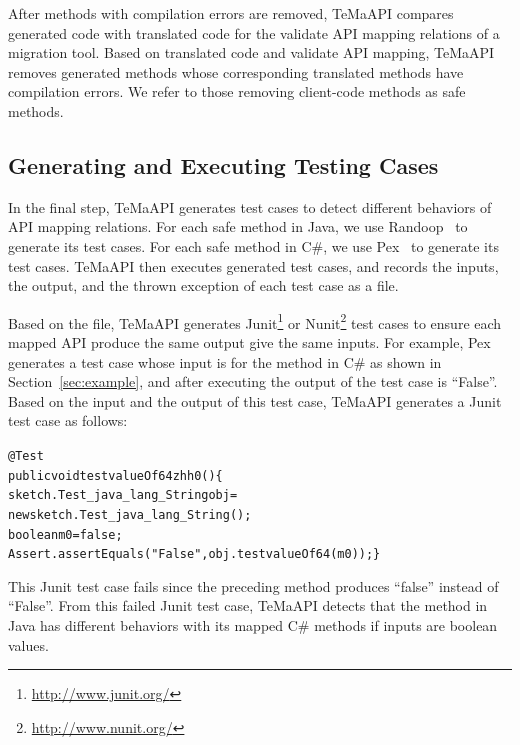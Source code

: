 After methods with compilation errors are removed, TeMaAPI compares generated code with translated code for the validate API mapping relations of a migration tool. Based on translated code and validate API mapping, TeMaAPI removes generated methods whose corresponding translated methods have compilation errors. We refer to those removing client-code methods as safe methods.

\subsection{Generating and Executing Testing Cases}
\label{sec:approach:mappingmethods}
In the final step, TeMaAPI generates test cases to detect different behaviors of API mapping relations. For each safe method in Java, we use Randoop~\cite{pacheco2007feedback} to generate its test cases. For each safe method in C\#, we use Pex~\cite{tillmann2008pex} to generate its test cases. TeMaAPI then executes generated test cases, and records the inputs, the output, and the thrown exception of each test case as a file.

Based on the file, TeMaAPI generates Junit\footnote{\url{http://www.junit.org/}} or Nunit\footnote{\url{http://www.nunit.org/}} test cases to ensure each mapped API produce the same output give the same inputs. For example, Pex generates a test case whose input is  for the  method in C\# as shown in Section~\ref{sec:example}, and after executing the output of the test case is ``False''. Based on the input and the output of this test case, TeMaAPI generates a Junit test case as follows:

\begin{CodeOut}%
\begin{alltt}
 @Test
 public void testvalueOf64zhh0()\{
   sketch.Test_java_lang_String obj =
                       new sketch.Test_java_lang_String();
   boolean m0 = false;
   Assert.assertEquals("False", obj.testvalueOf64(m0));\}
\end{alltt}
\end{CodeOut}

This Junit test case fails since the preceding  method produces ``false'' instead of ``False''. From this failed Junit test case, TeMaAPI detects that the  method in Java has different behaviors with its mapped C\# methods if inputs are boolean values.

